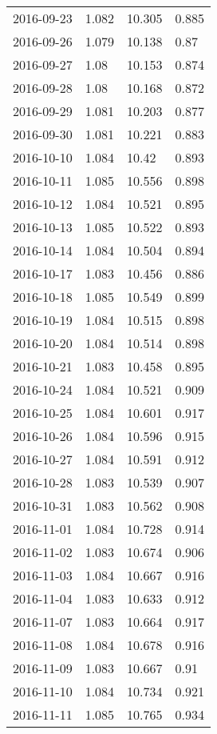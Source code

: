 \begin{center}
\begin{longtable}{r lll}
    2016-09-23 & 1.082  & 10.305 & 0.885  \\
    2016-09-26 & 1.079  & 10.138 & 0.87   \\
    2016-09-27 & 1.08   & 10.153 & 0.874  \\
    2016-09-28 & 1.08   & 10.168 & 0.872  \\
    2016-09-29 & 1.081  & 10.203 & 0.877  \\
    2016-09-30 & 1.081  & 10.221 & 0.883  \\
    2016-10-10 & 1.084  & 10.42  & 0.893  \\
    2016-10-11 & 1.085  & 10.556 & 0.898  \\
    2016-10-12 & 1.084  & 10.521 & 0.895  \\
    2016-10-13 & 1.085  & 10.522 & 0.893  \\
    2016-10-14 & 1.084  & 10.504 & 0.894  \\
    2016-10-17 & 1.083  & 10.456 & 0.886  \\
    2016-10-18 & 1.085  & 10.549 & 0.899  \\
    2016-10-19 & 1.084  & 10.515 & 0.898  \\
    2016-10-20 & 1.084  & 10.514 & 0.898  \\
    2016-10-21 & 1.083  & 10.458 & 0.895  \\
    2016-10-24 & 1.084  & 10.521 & 0.909  \\
    2016-10-25 & 1.084  & 10.601 & 0.917  \\
    2016-10-26 & 1.084  & 10.596 & 0.915  \\
    2016-10-27 & 1.084  & 10.591 & 0.912  \\
    2016-10-28 & 1.083  & 10.539 & 0.907  \\
    2016-10-31 & 1.083  & 10.562 & 0.908  \\
    2016-11-01 & 1.084  & 10.728 & 0.914  \\
    2016-11-02 & 1.083  & 10.674 & 0.906  \\
    2016-11-03 & 1.084  & 10.667 & 0.916  \\
    2016-11-04 & 1.083  & 10.633 & 0.912  \\
    2016-11-07 & 1.083  & 10.664 & 0.917  \\
    2016-11-08 & 1.084  & 10.678 & 0.916  \\
    2016-11-09 & 1.083  & 10.667 & 0.91   \\
    2016-11-10 & 1.084  & 10.734 & 0.921  \\
    2016-11-11 & 1.085  & 10.765 & 0.934  \\

\end{longtable}
\end{center}
